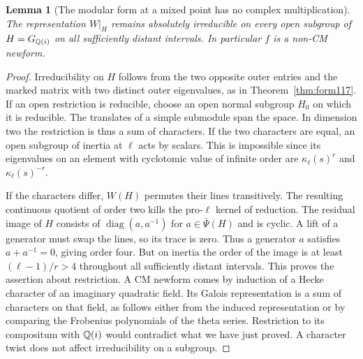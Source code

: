 \documentclass[a4paper,11pt]{article}
\newtheorem{lemma}[proposition]{Lemma}
\theoremstyle{definition}
\theoremstyle{remark}
\numberwithin{equation}{section}
\begin{document}
\begin{lemma}[The modular form at a mixed point has no complex multiplication]
\label{lem:nocm120}
The representation \(W|_H\) remains absolutely irreducible
on every open subgroup of \(H=G_{\mathbb Q(i)}\) on all sufficiently
distant intervals. In particular \(f\) is a non-CM newform.
\end{lemma}
\begin{proof}
Irreducibility on \(H\) follows from the two opposite outer
entries and the marked matrix with two distinct outer eigenvalues,
as in Theorem~\ref{thm:form117}. If an open restriction is
reducible, choose an open normal subgroup \(H_0\) on which it
is reducible. The translates of a simple submodule span the
space. In dimension two the restriction is thus a sum of
characters. If the two characters are equal, an open subgroup
of inertia at \(\ell\) acts by scalars. This is impossible
since its eigenvalues on an element with cyclotomic value of
infinite order are \(\kappa_\ell(s)^r\) and
\(\kappa_\ell(s)^{-r}\).

If the characters differ, \(W(H)\) permutes their lines
transitively. The resulting continuous quotient of order two
kills the pro-\(\ell\) kernel of reduction. The residual image
of \(H\) consists of \(\operatorname{diag}(a,a^{-1})\)
for \(a\in\bar\Psi(H)\) and is cyclic. A lift of a generator
must swap the lines, so its trace is zero. Thus a generator
\(a\) satisfies \(a+a^{-1}=0\), giving order four. But on
inertia the order of the image is at least \((\ell-1)/r>4\)
throughout all sufficiently distant intervals. This proves
the assertion about restriction. A CM newform comes by
induction of a Hecke character of an imaginary quadratic
field. Its Galois representation is a sum of characters on
that field, as follows either from the induced representation
or by comparing the Frobenius polynomials of the theta series.
Restriction to its compositum with \(\mathbb Q(i)\) would contradict
what we have just proved. A character twist does not affect
irreducibility on a subgroup.
\end{proof}
\end{document}
